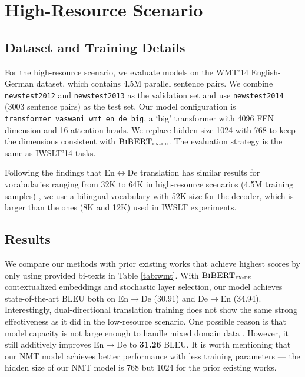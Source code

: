 \documentclass[11pt]{article}
\begin{document}
\section{High-Resource Scenario}
\label{sec:wmt}


\subsection{Dataset and Training Details}
For the high-resource scenario, we evaluate models on the WMT'14 English-German dataset, which contains 4.5M parallel sentence pairs. We combine \texttt{newstest2012} and \texttt{newstest2013} as the validation set and use \texttt{newstest2014} (3003 sentence pairs) as the test set. Our model configuration is \texttt{transformer\_vaswani\_wmt\_en\_de\_big}, a `big' transformer with 4096 FFN dimension and 16 attention heads. We replace hidden size 1024 with 768 to keep the dimensions consistent with $\textsc{BiBERT}_\textsc{en-de}$. The evaluation strategy is the same as IWSLT'14 tasks.

Following the findings that En$\leftrightarrow$De translation has similar results for vocabularies ranging from 32K to 64K in high-resource scenarios (4.5M training samples) \citep{gowda-may-2020-finding}, we use a bilingual vocabulary with 52K size for the decoder, which is larger than the ones (8K and 12K) used in IWSLT experiments.


\subsection{Results}
We compare our methods with prior existing works that achieve highest scores by only using provided bi-texts in Table \ref{tab:wmt}. With $\textsc{BiBERT}_\textsc{en-de}$ contextualized embeddings and stochastic layer selection, our model achieves state-of-the-art BLEU both on En$\rightarrow$De (30.91) and De$\rightarrow$En (34.94). Interestingly, dual-directional translation training does not show the same strong effectiveness as it did in the low-resource scenario. One possible reason is that model capacity is not large enough to handle mixed domain data \citep{arivazhagan2019massively}. However, it still additively improves En$\rightarrow$De to \textbf{31.26} BLEU. It is worth mentioning that our NMT model achieves better performance with less training parameters --- the hidden size of our NMT model is 768 but 1024 for the prior existing works.
\end{document}
